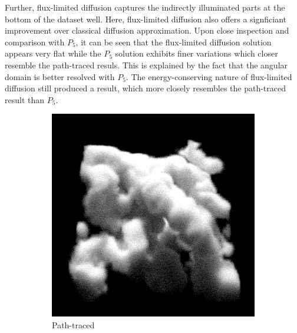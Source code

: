 Further, flux-limited diffusion captures the indirectly illuminated parts at the bottom of the dataset well. Here, flux-limited diffusion also offers a signficiant improvement over classical diffusion approximation. Upon close inspection and comparison with $P_5$, it can be seen that the flux-limited diffusion solution appears very flat while the $P_5$ solution exhibits finer variations which closer resemble the path-traced resuls. This is explained by the fact that the angular domain is better resolved with $P_5$. The energy-conserving nature of flux-limited diffusion still produced a result, which more closely resembles the path-traced result than $P_5$.

\begin{figure}[h]
\centering
\begin{subfigure}[t]{0.48\columnwidth}
\includegraphics[width=\columnwidth]{06_fld/results/nebulae_ms_groundtruth.png}
\caption{Path-traced}
\label{fig:fld_results_nebulae_1}
\end{subfigure}
\hspace{0.01\columnwidth}
\begin{subfigure}[t]{0.48\columnwidth}

\end{subfigure}
\end{figure}
